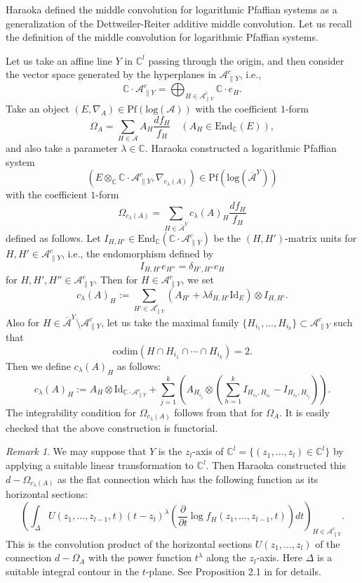 \documentclass[a4paper,12pt]{article}
\theoremstyle{definition}
\theoremstyle{remark}
\newtheorem{rem}[thm]{Remark}
\begin{document}
Haraoka \cite{Har1} defined the middle convolution for logarithmic Pfaffian systems
as a generalization of the Dettweiler-Reiter additive middle convolution.
Let us recall the definition of the middle convolution for logarithmic Pfaffian systems.

Let us take an affine line $Y$ in $\mathbb{C}^{l}$ passing through the origin,
and then consider the vector space generated by the hyperplanes in $\mathcal{A}_{\parallel Y}^{c}$, i.e., 
\[
	\mathbb{C}\cdot \mathcal{A}_{\parallel Y}^{c}=\bigoplus_{H\in \mathcal{A}_{\parallel Y}^{c}}\mathbb{C}\cdot e_{H}.
\]
Take an object $(E,\nabla_{A})\in \mathrm{Pf}(\mathrm{log}(\mathcal{A}))$
with the coefficient $1$-form  
\[
	\Omega_{A}=
	\sum_{H\in \mathcal{A}}A_{H}\frac{df_{H}}{f_{H}}\quad (A_{H}\in \mathrm{End}_{\mathbb{C}}(E)),
\]
and also take a parameter $\lambda\in \mathbb{C}$.
Haraoka constructed a logarithmic Pfaffian system
\[	
	(E\otimes_{\mathbb{C}}\mathbb{C}\cdot \mathcal{A}_{\parallel Y}^{c},\nabla_{c_{\lambda}(A)})\in \mathrm{Pf}(\mathrm{log}(\overline{\mathcal{A}}^{Y}))	
\]
with the coefficient $1$-form
\[
	\Omega_{c_{\lambda}(A)}=
	\sum_{H\in \overline{\mathcal{A}}^{Y}}c_{\lambda}(A)_{H}\frac{df_{H}}{f_{H}}
\]
defined as follows.
Let $I_{H,H'}\in \mathrm{End}_{\mathbb{C}}(\mathbb{C}\cdot \mathcal{A}_{\parallel Y}^{c})$
be the $(H,H')$-matrix units for $H,H'\in \mathcal{A}_{\parallel Y}^{c}$,
i.e., the endomorphism defined by 
\[
I_{H,H'}e_{H''}=\delta_{H',H''}e_{H}
\]
for $H,H',H''
\in \mathcal{A}_{\parallel Y}^{c}$.
Then for $H\in \mathcal{A}_{\parallel Y}^{c}$, we set  
\[
	c_{\lambda}(A)_{H}:=\sum_{H'\in \mathcal{A}_{\parallel Y}^{c}}(A_{H'}+\lambda\delta_{H,H'}\mathrm{Id}_{E})\otimes I_{H,H'}.
\]
Also for $H\in \overline{\mathcal{A}}^{Y}\setminus \mathcal{A}_{\parallel Y}^{c}$,
let us take 
the maximal family $\{H_{i_{1}},\ldots,H_{i_{k}}\}\subset \mathcal{A}_{\parallel Y}^{c}$ such that 
\[
	\mathrm{codim}(H\cap H_{i_{1}}\cap\cdots\cap H_{i_{k}})=2.
\]
Then we define $c_{\lambda}(A)_{H}$ as follows:
\[
	c_{\lambda}(A)_{H}:=A_{H}\otimes \mathrm{Id}_{\mathbb{C}\cdot \mathcal{A}_{\parallel Y}^{c}}+
	\sum_{j=1}^{k}\left(A_{H_{i_{j}}}\otimes \left(\sum_{h=1}^{k}I_{H_{i_{h}},H_{i_{h}}}-I_{H_{i_{h}},H_{i_{j}}}\right)\right).
\]
The integrability condition for $\Omega_{c_{\lambda}(A)}$
follows from that for $\Omega_{A}$.
It is easily checked that the above construction is functorial.
\begin{rem}
We may suppose that $Y$ is the $z_{l}$-axis 
of $\mathbb{C}^{l}=\{(z_{1},\ldots,z_{l})\in \mathbb{C}^{l}\}$
by applying a suitable linear transformation to $\mathbb{C}^{l}$.
Then 
Haraoka constructed this  $d-\Omega_{c_{\lambda}(A)}$
as the flat connection which has 
the following function as its horizontal sections: 
\[
	\left(\int_{\Delta}U(z_{1},\ldots,z_{l-1},t)(t-z_{l})^{\lambda}\left(\frac{\partial}{\partial t}\log f_{H}(z_{1},\ldots,z_{l-1},t)\right)dt\right)_{H\in \mathcal{A}_{\parallel Y}^{c}}.
\]
This is  the convolution product 
of the horizontal sections $U(z_{1},\ldots,z_{l})$ 
of the connection $d-\Omega_{A}$ 
with the power function $t^{\lambda}$ along the $z_{l}$-axis.
Here $\Delta$ is a suitable integral contour in the $t$-plane.
See Proposition 2.1 in \cite{Har1} for details.
\end{rem}
\end{document}
